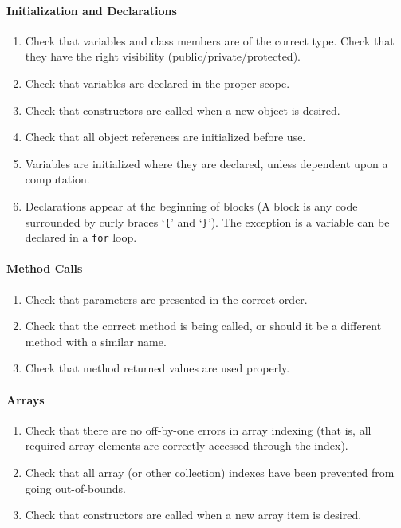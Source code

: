 \paragraph*{Initialization and Declarations}\begin{enumerate}[resume]
\item Check that variables and class members are of the correct type. Check that they have the right visibility (public/private/protected).
\item Check that variables are declared in the proper scope.
\item Check that constructors are called when a new object is desired.
\item Check that all object references are initialized before use.
\item Variables are initialized where they are declared, unless dependent upon a computation.
\item Declarations appear at the beginning of blocks (A block is any code surrounded by curly braces `\texttt{\{}' and `\texttt{\}}'). The exception is a variable can be declared in a \texttt{for} loop.
\end{enumerate}

\paragraph*{Method Calls}\begin{enumerate}[resume]
\item Check that parameters are presented in the correct order.
\item Check that the correct method is being called, or should it be a different method with a similar name.
\item Check that method returned values are used properly.
\end{enumerate}

\paragraph*{Arrays}\begin{enumerate}[resume]
\item Check that there are no off-by-one errors in array indexing (that is, all required array elements are correctly accessed through the index).
\item Check that all array (or other collection) indexes have been prevented from going out-of-bounds.
\item Check that constructors are called when a new array item is desired.
\end{enumerate}

